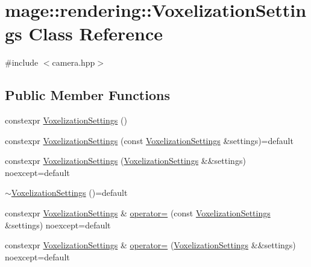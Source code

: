 \hypertarget{classmage_1_1rendering_1_1_voxelization_settings}{}\section{mage\+:\+:rendering\+:\+:Voxelization\+Settings Class Reference}
\label{classmage_1_1rendering_1_1_voxelization_settings}


{\ttfamily \#include $<$camera.\+hpp$>$}

\subsection*{Public Member Functions}
\begin{DoxyCompactItemize}
\item 
constexpr \mbox{\hyperlink{classmage_1_1rendering_1_1_voxelization_settings_a5c866be104571097091b07f113b2f680}{Voxelization\+Settings}} ()
\item 
constexpr \mbox{\hyperlink{classmage_1_1rendering_1_1_voxelization_settings_a62f8755e86da892cd22467309fecfe95}{Voxelization\+Settings}} (const \mbox{\hyperlink{classmage_1_1rendering_1_1_voxelization_settings}{Voxelization\+Settings}} \&settings)=default
\item 
constexpr \mbox{\hyperlink{classmage_1_1rendering_1_1_voxelization_settings_af706582ce61228cd994aa72c537aa020}{Voxelization\+Settings}} (\mbox{\hyperlink{classmage_1_1rendering_1_1_voxelization_settings}{Voxelization\+Settings}} \&\&settings) noexcept=default
\item 
\mbox{\hyperlink{classmage_1_1rendering_1_1_voxelization_settings_aa9593796b2dd3b9d3a8f6b00ba225778}{$\sim$\+Voxelization\+Settings}} ()=default
\item 
constexpr \mbox{\hyperlink{classmage_1_1rendering_1_1_voxelization_settings}{Voxelization\+Settings}} \& \mbox{\hyperlink{classmage_1_1rendering_1_1_voxelization_settings_ae21513856299e74c147c5d347b36961a}{operator=}} (const \mbox{\hyperlink{classmage_1_1rendering_1_1_voxelization_settings}{Voxelization\+Settings}} \&settings) noexcept=default
\item 
constexpr \mbox{\hyperlink{classmage_1_1rendering_1_1_voxelization_settings}{Voxelization\+Settings}} \& \mbox{\hyperlink{classmage_1_1rendering_1_1_voxelization_settings_a96ea5fa3e2a8bdab0b4835caa11bd13f}{operator=}} (\mbox{\hyperlink{classmage_1_1rendering_1_1_voxelization_settings}{Voxelization\+Settings}} \&\&settings) noexcept=default

\end{DoxyCompactItemize}
